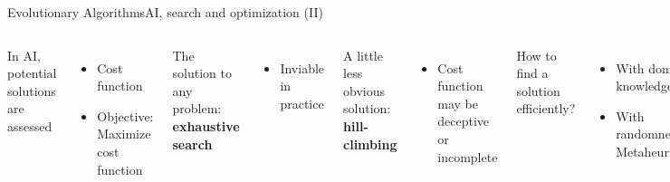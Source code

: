\documentclass[10pt,compress]{beamer} %
\begin{document}
\begin{frame}{Evolutionary Algorithms}{AI, search and optimization (II)}
    \begin{columns}
	In AI, potential solutions are assessed
	\begin{itemize}
		\item Cost function
		\item Objective: Maximize cost function
	\end{itemize}
	The solution to any problem: \textbf{exhaustive search}
	\begin{itemize}
	\item Inviable in practice
	\end{itemize}
    A little less obvious solution: \textbf{hill-climbing}
    \begin{itemize}
    \item Cost function may be deceptive or incomplete
    \end{itemize}
	How to find a solution efficiently?
	\begin{itemize}
		\item With domain knowledge
		\item With randomness: \alert{Metaheuristics}
	\end{itemize}

	\begin{center}
		\includegraphics[width=\linewidth]{figs/landscape.png}\\
		\tiny{\href{http://www.handmade-insights.com/blog/2013/genetic-algorithmslandscape}{(Source)}}\\
	\end{center}
	\end{columns}
\end{frame}
\end{document}
